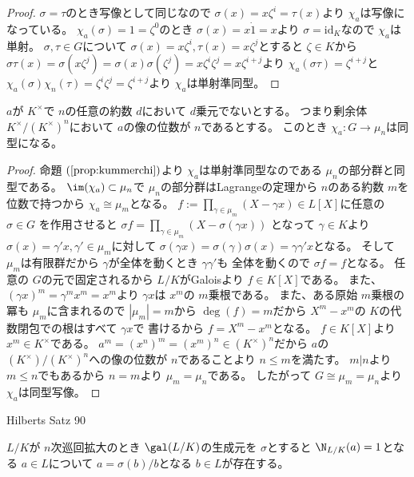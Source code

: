 \documentclass[../master_galois_theory]{subfiles}
\begin{document}
\begin{proof}
  $\sigma = \tau$のとき写像として同じなので $\sigma(x) = x \zeta^i = \tau(x)$より $\chi_a$は写像になっている。
  $\chi_a(\sigma) = 1 = \zeta^0$のとき $\sigma(x) = x \dot 1 = x$より
  $\sigma = \mathrm{id}_K$なので $\chi_a$は単射。
  $\sigma , \tau \in G$について $\sigma(x) = x \zeta^i , \tau(x) = x \zeta^j$とすると $\zeta \in K$から
  $\sigma \tau(x) = \sigma(x \zeta^j) = \sigma(x) \sigma(\zeta^j) = x \zeta^i \zeta^j = x \zeta^{i + j}$より
  $\chi_a(\sigma \tau) = \zeta^{i + j}$と
  $\chi_a(\sigma) \chi_n(\tau) = \zeta^i \zeta^j = \zeta^{i + j}$より
  $\chi_a$は単射準同型。
\end{proof}

\begin{corl}
  $a$が $K^\times$で $n$の任意の約数 $d$において $d$乗元でないとする。
  つまり剰余体 $K^\times/(K^\times)^n$において $a$の像の位数が $n$であるとする。
  このとき $\chi_a : G \longrightarrow \mu_n$は同型になる。
\end{corl}

\begin{proof}
  命題 $(\mathrm{\ref{prop:kummerchi}})$より $\chi_a$は単射準同型なのである $\mu_n$の部分群と同型である。
  $\im(\chi_a) \subset \mu_n$で $\mu_n$の部分群は\rm{Lagrange}の定理から
  $n$のある約数 $m$を位数で持つから $\chi_a \cong \mu_m$となる。
  $f := \prod_{\gamma \in \mu_m}(X - \gamma x) \in L[X]$に任意の $\sigma \in G$
  を作用させると $\sigma f = \prod_{\gamma \in \mu_m}(X - \sigma(\gamma x))$
  となって $\gamma \in K$より $\sigma(x) = \gamma' x , \gamma' \in \mu_m$に対して
  $\sigma(\gamma x) = \sigma(\gamma) \sigma(x) = \gamma \gamma' x$となる。
  そして $\mu_m$は有限群だから $\gamma$が全体を動くとき $\gamma \gamma'$も
  全体を動くので $\sigma f = f$となる。
  任意の $G$の元で固定されるから $L/K$が\rm{Galois}より $f \in K[X]$である。
  また、 $(\gamma x)^m = \gamma^m x^m = x^m$より $\gamma x$は $x^m$の
  $m$乗根である。
  また、ある原始 $m$乗根の冪も $\mu_m$に含まれるので $|\mu_m| = m$から
  $\deg(f) = m$だから $X^m - x^m$の $K$の代数閉包での根はすべて $\gamma x$で
  書けるから $f = X^m - x^m$となる。
  $f \in K[X]$より $x^m \in K^\times$である。
  $a^m = (x^n)^m = (x^m)^n \in (K^\times)^n$だから
  $a$の $(K^\times)/(K^\times)^n$への像の位数が $n$であることより
  $n \leq m$を満たす。
  $m | n$より $m \leq n$でもあるから $n = m$より $\mu_m = \mu_n$である。
  したがって $G \cong \mu_m = \mu_n$より $\chi_a$は同型写像。
\end{proof}

\begin{theo} \label{theo:hilbertssatz90}
  \rm{Hilberts Satz 90}

  $L/K$が $n$次巡回拡大のとき $\gal(L/K)$の生成元を $\sigma$とすると
  $\N_{L/K}(a) = 1$となる $a \in L$について
  $a = \sigma(b)/b$となる $b \in L$が存在する。
\end{theo}
\end{document}
